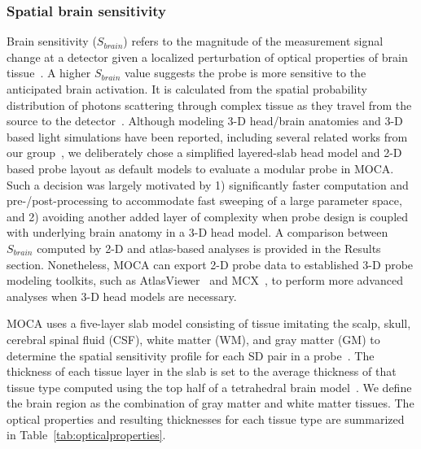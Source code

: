 \subsubsection{Spatial brain sensitivity}
\label{sssec:averagebrainsensitivity}
Brain sensitivity ($S_{brain}$) refers to the magnitude of the measurement signal change at a detector given a localized perturbation of optical properties of brain tissue~\cite{Strangman2013}. A higher $S_{brain}$ value suggests the probe is more sensitive to the anticipated brain activation. It is calculated from the spatial probability distribution of photons scattering through complex tissue as they travel from the source to the detector~\cite{Brigadoi2015}. Although modeling 3-D head/brain anatomies and 3-D based light simulations have been reported, including several related works from our group~\cite{Fang2009,Fang2009a,Fang2010,Brain2Mesh2020}, we deliberately chose a simplified layered-slab head model and 2-D based probe layout as default models to evaluate a modular probe in \ac{MOCA}. Such a decision was largely motivated by 1) significantly faster computation and pre-/post-processing to accommodate fast sweeping of a large parameter space, and 2) avoiding another added layer of complexity when probe design is coupled with underlying brain anatomy in a 3-D head model. A comparison between $S_{brain}$ computed by 2-D and atlas-based analyses is provided in the Results section. Nonetheless, \ac{MOCA} can export 2-D probe data to established 3-D probe modeling toolkits, such as AtlasViewer~\cite{Aasted2015} and MCX~\cite{Fang2009}, to perform more advanced analyses when 3-D head models are necessary.

\ac{MOCA} uses a five-layer slab model consisting of tissue imitating the scalp, skull, cerebral spinal fluid (CSF), white matter (WM), and gray matter (GM) to determine the spatial sensitivity profile for each \ac{SD} pair in a probe~\cite{Okada2003}. The thickness of each tissue layer in the slab is set to the average thickness of that tissue type computed using the top half of a tetrahedral brain model~\cite{Sanchez2012}. We define the brain region as the combination of gray matter and white matter tissues. The optical properties and resulting thicknesses for each tissue type are summarized in Table~\ref{tab:opticalproperties}.

